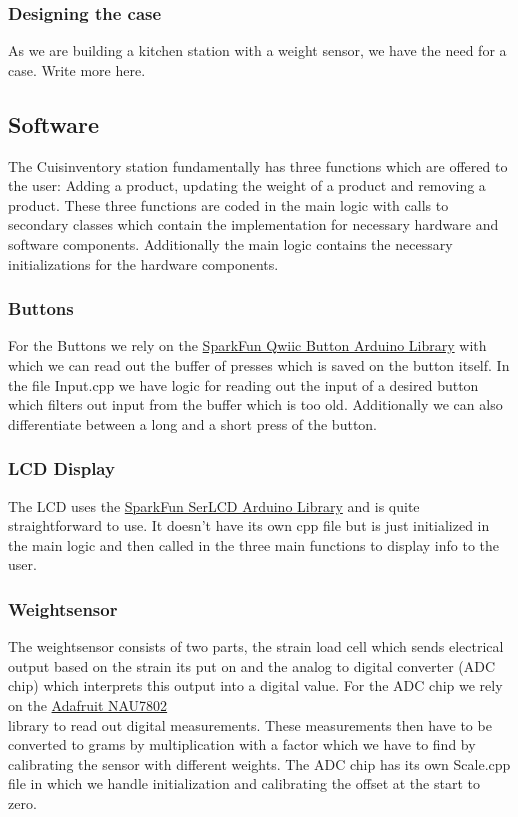 \documentclass{article}
\begin{document}
\subsubsection{Designing the case}
As we are building a kitchen station with a weight sensor, we have the need for a case.
Write more here.
\subsection{Software}
The Cuisinventory station fundamentally has three functions which are offered to the user: Adding a product, updating the weight of a product and removing a product.
These three functions are coded in the main logic with calls to secondary classes which contain the implementation for necessary hardware and software components.
Additionally the main logic contains the necessary initializations for the hardware components. 
\subsubsection{Buttons}
For the Buttons we rely on the \href{https://github.com/sparkfun/SparkFun_Qwiic_Button_Arduino_Library}{SparkFun Qwiic Button Arduino Library} with which we can read out the buffer of presses which is saved on the button itself.
In the file Input.cpp we have logic for reading out the input of a desired button which filters out input from the buffer which is too old.
Additionally we can also differentiate between a long and a short press of the button.
\subsubsection{LCD Display}
The LCD uses the \href{https://github.com/sparkfun/SparkFun_SerLCD_Arduino_Library}{SparkFun SerLCD Arduino Library} and is quite straightforward to use. It doesn't have its own cpp file but is just initialized in the main logic
and then called in the three main functions to display info to the user.
\subsubsection{Weightsensor}
The weightsensor consists of two parts, the strain load cell which sends electrical output based on the strain its put on and the analog to digital converter (ADC chip) which interprets this output into a digital value.
For the ADC chip we rely on the \href{https://github.com/adafruit/Adafruit_NAU7802}{Adafruit NAU7802}\\ library to read out digital measurements.
These measurements then have to be converted to grams by multiplication with a factor which we have to find by calibrating the sensor with different weights.
The ADC chip has its own Scale.cpp file in which we handle initialization and calibrating the offset at the start to zero.
\end{document}

